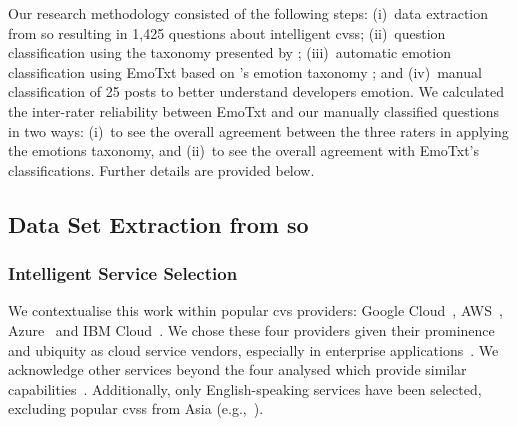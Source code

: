Our research methodology consisted of the following steps: (i)~data extraction from \gls{so} resulting in 1,425 questions about intelligent \glspl{cvs}; (ii)~question classification using the taxonomy presented by \citet{Beyer:2018fm}; (iii)~automatic emotion classification using EmoTxt based on \citeauthor{shaver1987}'s emotion taxonomy \citep{shaver1987}; and (iv)~manual classification of 25 posts to better understand developers emotion. We calculated the inter-rater reliability between EmoTxt and our manually classified questions in two ways: (i)~to see the overall agreement between the three raters in applying the \citeauthor{shaver1987} emotions taxonomy, and (ii)~to see the overall agreement with EmoTxt's classifications. Further details are provided below.

\def \alexnumauthor {second}

\subsection{Data Set Extraction from \gls{so}}

\subsubsection{Intelligent Service Selection}

We contextualise this work within popular \gls{cvs} providers: Google Cloud~, AWS~, Azure~ and IBM Cloud~.
We chose these four providers given their prominence and ubiquity as cloud service vendors, especially in enterprise applications~\citep{RightScaleInc:2018kJ}. We acknowledge other services beyond the four analysed which provide similar capabilities~. Additionally, only English-speaking services have been selected, excluding popular \glspl{cvs} from Asia (e.g.,~).


